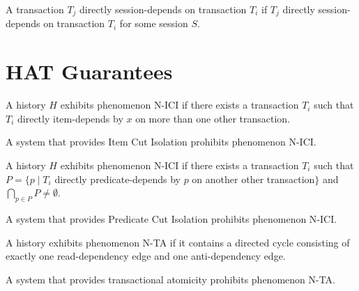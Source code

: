 \begin{definition}
A transaction $T_j$ directly session-depends on transaction $T_i$ if
$T_j$ directly session-depends on transaction $T_i$ for some session
$S$.
\end{definition}

\section{HAT Guarantees}

\begin{definition}
\end{definition}

\begin{definition}
\end{definition}

\begin{definition}
A history $H$ exhibits phenomenon N-ICI if there exists a transaction
$T_i$ such that $T_i$ directly item-depends by $x$ on more than one
other transaction.
\end{definition}

\begin{definition}
A system that provides Item Cut Isolation prohibits phenomenon N-ICI.
\end{definition}

\begin{definition}
A history $H$ exhibits phenomenon N-ICI if there exists a transaction
$T_i$ such that $P= \{p \mid T_i$ directly predicate-depends by $p$ on another
other transaction$\}$ and $\bigcap_{p\in P} P \neq \emptyset$.
\end{definition}

\begin{definition}
A system that provides Predicate Cut Isolation prohibits phenomenon N-ICI.
\end{definition}

\begin{definition}
A history exhibits phenomenon N-TA if it contains a directed cycle
consisting of exactly one read-dependency edge and one anti-dependency
edge.
\end{definition}

\begin{definition}
A system that provides transactional atomicity prohibits phenomenon
N-TA.
\end{definition}

